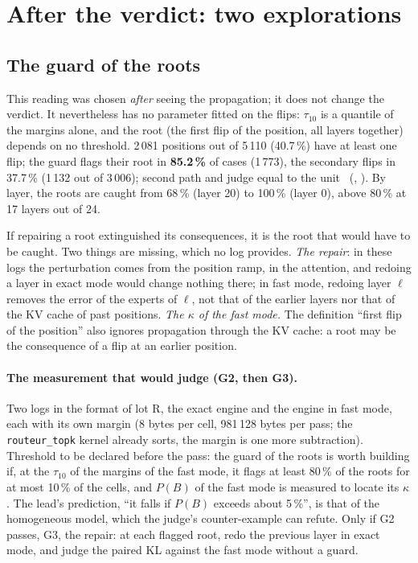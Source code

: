 \section{After the verdict: two explorations}\label{t3tro:sec:explorations}

\subsection{The guard of the roots}\label{t3tro:sec:racines}

This reading was chosen \emph{after} seeing the propagation; it does not change the verdict. It nevertheless has no parameter fitted on the flips: $\tau_{10}$ is a quantile of the margins alone, and the root (the first flip of the position, all layers together) depends on no threshold. 2\,081 positions out of 5\,110 (40.7\,\%) have at least one flip; the guard flags their root in \textbf{85.2\,\%} of cases (1\,773), the secondary flips in 37.7\,\% (1\,132 out of 3\,006); second path and judge equal to the unit \mes~(, ). By layer, the roots are caught from 68\,\% (layer 20) to 100\,\% (layer 0), above 80\,\% at 17 layers out of 24.

If repairing a root extinguished its consequences, it is the root that would have to be caught. Two things are missing, which no log provides. \emph{The repair}: in these logs the perturbation comes from the position ramp, in the attention, and redoing a layer in exact mode would change nothing there; in fast mode, redoing layer $\ell$ removes the error of the experts of $\ell$, not that of the earlier layers nor that of the KV cache of past positions. \emph{The $\kappa$ of the fast mode.} The definition ``first flip of the position'' also ignores propagation through the KV cache: a root may be the consequence of a flip at an earlier position.

\paragraph{The measurement that would judge (G2, then G3).} Two logs in the format of lot R, the exact engine and the engine in fast mode, each with its own margin (8 bytes per cell, 981\,128 bytes per pass; the \texttt{routeur\_topk} kernel already sorts, the margin is one more subtraction). Threshold to be declared before the pass: the guard of the roots is worth building if, at the $\tau_{10}$ of the margins of the fast mode, it flags at least 80\,\% of the roots for at most 10\,\% of the cells, and $P(B)$ of the fast mode is measured to locate its $\kappa$. The lead's prediction, ``it falls if $P(B)$ exceeds about 5\,\%'', is that of the homogeneous model, which the judge's counter-example can refute. Only if G2 passes, G3, the repair: at each flagged root, redo the previous layer in exact mode, and judge the paired KL against the fast mode without a guard.

